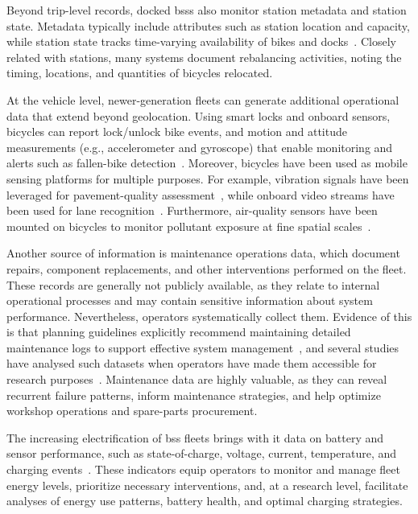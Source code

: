 Beyond trip-level records, docked \acp{bss} also monitor station metadata and station state. Metadata typically include attributes such as station location and capacity, while station state tracks time-varying availability of bikes and docks~\cite{FaghihImani2014, CortezOrdonez2024}. Closely related with stations, many systems document rebalancing activities, noting the timing, locations, and quantities of bicycles relocated.

At the vehicle level, newer-generation fleets can generate additional operational data that extend beyond geolocation. Using smart locks and onboard sensors, bicycles can report lock/unlock bike events, and motion and attitude measurements (e.g., accelerometer and gyroscope) that enable monitoring and alerts such as fallen-bike detection~\cite{Xue2020}. Moreover, bicycles have been used as mobile sensing platforms for multiple purposes. For example, vibration signals have been leveraged for pavement-quality assessment~\cite{Qian2020Predicting}, while onboard video streams have been used for lane recognition~\cite{Kaundanya2024}. Furthermore, air-quality sensors have been mounted on bicycles to monitor pollutant exposure at fine spatial scales~\cite{Wu2020}.

Another source of information is maintenance operations data, which document repairs, component replacements, and other interventions performed on the fleet. These records are generally not publicly available, as they relate to internal operational processes and may contain sensitive information about system performance. Nevertheless, operators systematically collect them. Evidence of this is that planning guidelines explicitly recommend maintaining detailed maintenance logs to support effective system management~\cite{Yanocha2018}, and several studies have analysed such datasets when operators have made them accessible for research purposes~\cite{deBrito2022, Gregoire2018}. Maintenance data are highly valuable, as they can reveal recurrent failure patterns, inform maintenance strategies, and help optimize workshop operations and spare-parts procurement.

The increasing electrification of \ac{bss} fleets brings with it data on battery and sensor performance, such as state-of-charge, voltage, current, temperature, and charging events~\cite{Waldner2025}. These indicators equip operators to monitor and manage fleet energy levels, prioritize necessary interventions, and, at a research level, facilitate analyses of energy use patterns, battery health, and optimal charging strategies. 

